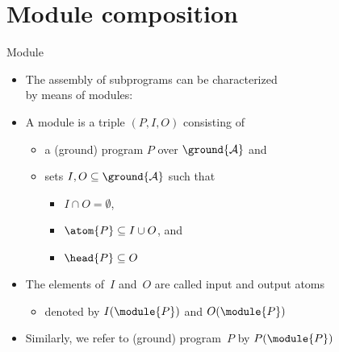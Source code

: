 \section{Module composition}
\begin{frame}[c]{Module}
  \begin{itemize}
  \item<1-> The assembly of subprograms can be characterized\\ by means of modules:
    \bigskip
  \item<2-> A \alert{module}  is a triple
    \(
    (P,I,O)
    \)
    consisting of
    \begin{itemize}\normalsize
    \item a (ground) program $P$ over $\ground{\mathcal{A}}$
      and
    \item sets $I,O\subseteq\ground{\mathcal{A}}$ such that
      \begin{itemize}\normalsize
      \item $I\cap O=\emptyset$,
      \item $\atom{P}\subseteq I\cup O$, and
      \item $\head{P}\subseteq O$
      \end{itemize}
    \end{itemize}
    \medskip
  \item<3-> The elements of~$I$ and~$O$ are called \alert{input} and \alert{output atoms}
    \begin{itemize}
    \item<4-> denoted by $I(\module{P})$ and $O(\module{P})$
    \end{itemize}
  \item<5-> Similarly, we refer to (ground) \alert{program}~$P$ by $P(\module{P})$
  \end{itemize}
\end{frame}
